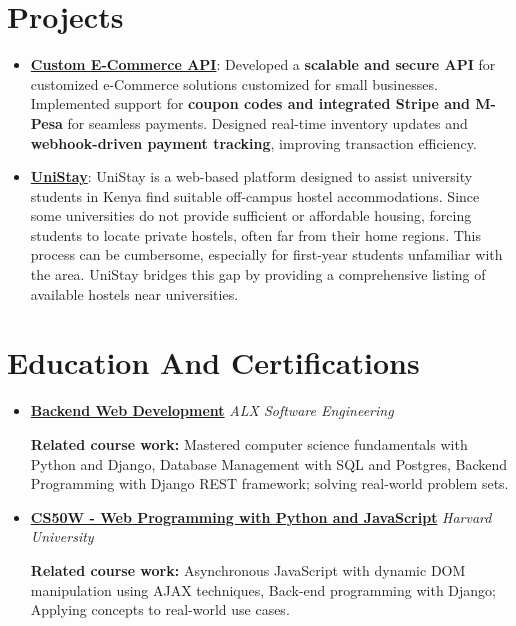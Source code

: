 \documentclass[letterpaper,11pt]{article}
\newcommand{\resumeItem}[2]{
  \item\small{
    \textbf{#1}{: #2 \vspace{-2pt}}
  }
}
\newcommand{\resumeSubHeadingListStart}{\begin{itemize}[leftmargin=*]}
\newcommand{\resumeSubHeadingListEnd}{\end{itemize}}
\begin{document}
\section*{Projects}
\resumeSubHeadingListStart
   \resumeItem{\href{https://github.com/Mr-waweru/Custom-E-Commerce-API.git}{Custom E-Commerce API}}{Developed a \textbf{scalable and secure API} for customized e-Commerce solutions customized for small businesses. Implemented support for \textbf{coupon codes and integrated Stripe and M-Pesa} for seamless payments. Designed real-time inventory updates and \textbf{webhook-driven payment tracking}, improving transaction efficiency.}
   \resumeItem{\href{https://github.com/Mr-waweru/UniStay.git}{UniStay}}{UniStay is a web-based platform designed to assist university students in Kenya find suitable off-campus hostel accommodations. Since some universities do not provide sufficient or affordable housing, forcing students to locate private hostels, often far from their home regions. This process can be cumbersome, especially for first-year students unfamiliar with the area. UniStay bridges this gap by providing a comprehensive listing of available hostels near universities.}
\resumeSubHeadingListEnd

\section*{Education And Certifications}
\begin{itemize}[leftmargin=0.15in]
  \item \textbf{\href{https://intranet.alxswe.com/certificates/CGeSsTnfPR}{Backend Web Development}} \hfill \textit{ALX Software Engineering}\\
    \begin{itemize}
      \textbf{Related course work: }Mastered computer science fundamentals with Python and Django, Database Management with SQL and Postgres, Backend Programming with Django REST framework; solving real-world problem sets.
    \end{itemize}
    \item \textbf{\href{https://certificates.cs50.io/9e725d06-1c5a-40a4-8bf4-f53c6fc59991.pdf?size=letter}{CS50W - Web Programming with Python and JavaScript}} \hfill \textit{Harvard University}\\
    \begin{itemize}
      \textbf{Related course work: }Asynchronous JavaScript with dynamic DOM manipulation using AJAX techniques, Back-end programming with Django; Applying concepts to real-world use cases.
    \end{itemize}
\end{itemize}
\end{document}
